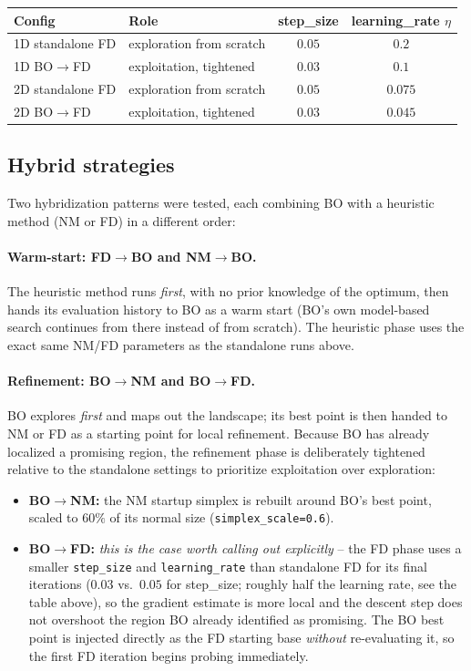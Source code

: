 \begin{center}
\begin{tabular}{@{}llcc@{}}
\toprule
Config & Role & step\_size & learning\_rate $\eta$ \\
\midrule
1D standalone FD & exploration from scratch & $0.05$ & $0.2$ \\
1D BO$\to$FD     & exploitation, tightened   & $0.03$ & $0.1$ \\
2D standalone FD & exploration from scratch & $0.05$ & $0.075$ \\
2D BO$\to$FD     & exploitation, tightened   & $0.03$ & $0.045$ \\
\bottomrule
\end{tabular}
\end{center}

\subsection{Hybrid strategies}

Two hybridization patterns were tested, each combining BO with a heuristic
method (NM or FD) in a different order:

\paragraph{Warm-start: FD$\to$BO and NM$\to$BO.} The heuristic method runs
\emph{first}, with no prior knowledge of the optimum, then hands its evaluation
history to BO as a warm start (BO's own model-based search continues from
there instead of from scratch). The heuristic phase uses the exact same NM/FD
parameters as the standalone runs above.

\paragraph{Refinement: BO$\to$NM and BO$\to$FD.} BO explores \emph{first} and
maps out the landscape; its best point is then handed to NM or FD as a starting
point for local refinement. Because BO has already localized a promising region,
the refinement phase is deliberately tightened relative to the standalone
settings to prioritize exploitation over exploration:
\begin{itemize}
  \item \textbf{BO$\to$NM:} the NM startup simplex is rebuilt around BO's best
        point, scaled to $60\%$ of its normal size (\texttt{simplex\_scale=0.6}).
  \item \textbf{BO$\to$FD:} \emph{this is the case worth calling out explicitly}
        -- the FD phase uses a smaller \texttt{step\_size} and
        \texttt{learning\_rate} than standalone FD for its final iterations
        ($0.03$ vs.\ $0.05$ for step\_size; roughly half the learning rate, see
        the table above), so the gradient estimate is more local and the
        descent step does not overshoot the region BO already identified as
        promising. The BO best point is injected directly as the FD starting
        base \emph{without} re-evaluating it, so the first FD iteration begins
        probing immediately.
\end{itemize}

